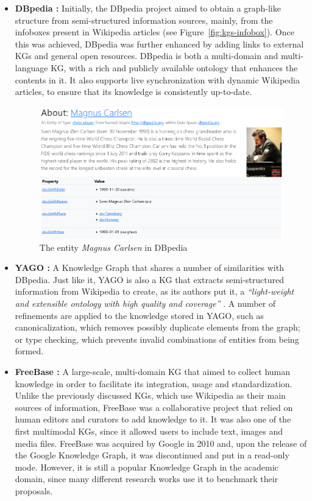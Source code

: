 \begin{itemize}
    \item \textbf{DBpedia \cite{lehmann2015dbpedia}:} Initially, the DBpedia project aimed to obtain a graph-like structure from semi-structured information sources, mainly, from the infoboxes present in Wikipedia articles (see Figure~\ref{fig:kgs-infobox}). Once this was achieved, DBpedia was further enhanced by adding links to external KGs and general open resources. DBpedia is both a multi-domain and multi-language KG, with a rich and publicly available ontology that enhances the contents in it. It also supports live synchronization with dynamic Wikipedia articles, to ensure that its knowledge is consistently up-to-date.
    
    \begin{figure}[!htp]
        \centering
        \includegraphics[width=\textwidth]{fig/kgs/dbpedia.png}
        \caption{The entity \textit{Magnus Carlsen} in DBpedia}
        \label{fig:kgs-dbpedia}
    \end{figure}

    \item \textbf{YAGO \cite{rebele2016}:} A Knowledge Graph that shares a number of similarities with DBpedia. Just like it, YAGO is also a KG that extracts semi-structured information from Wikipedia to create, as its authors put it, a \textit{``light-weight and extensible ontology with high quality and coverage''} \cite{suchanek2007}. A number of refinements are applied to the knowledge stored in YAGO, such as canonicalization, which removes possibly duplicate elements from the graph; or type checking, which prevents invalid combinations of entities from being formed.
    
    \item \textbf{FreeBase \cite{bollacker2008}:} A large-scale, multi-domain KG that aimed to collect human knowledge in order to facilitate its integration, usage and standardization. Unlike the previously discussed KGs, which use Wikipedia as their main sources of information, FreeBase was a collaborative project that relied on human editors and curators to add knowledge to it. It was also one of the first multimodal KGs, since it allowed users to include text, images and media files. FreeBase was acquired by Google in 2010 and, upon the release of the Google Knowledge Graph, it was discontinued and put in a read-only mode. However, it is still a popular Knowledge Graph in the academic domain, since many different research works use it to benchmark their proposals.
    

\end{itemize}

